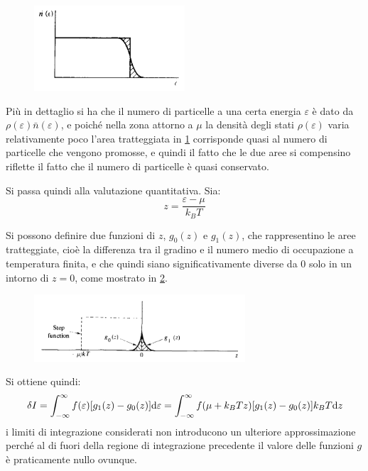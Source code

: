 \begin{figure}[b]
	\centering
	\includegraphics[width=0.5\textwidth]{Immagini/SmoothStep.png}
	\caption{}
	\label{fig:stepsmooth}
\end{figure}

Più in dettaglio si ha che il numero di particelle a una certa energia $\varepsilon$ è dato da $\rho(\varepsilon)\bar{n}(\varepsilon)$, e poiché nella zona attorno a $\mu$ la densità degli stati $\rho(\varepsilon)$ varia relativamente poco l'area tratteggiata in \cref{fig:stepsmooth} corrisponde quasi al numero di particelle che vengono promosse, e quindi il fatto che le due aree si compensino riflette il fatto che il numero di particelle è quasi conservato.
\newline

Si passa quindi alla valutazione quantitativa. Sia:
\begin{equation*}
	z = \frac{\varepsilon - \mu}{k_B T}
\end{equation*}

Si possono definire due funzioni di $z$, $g_0(z)$ e $g_1(z)$, che rappresentino le aree tratteggiate, cioè la differenza tra il gradino e il numero medio di occupazione a temperatura finita, e che quindi siano significativamente diverse da $0$ solo in un intorno di $z=0$, come mostrato in \cref{fig:stepdiffunc}.

\begin{figure}[t]
	\centering
	\includegraphics[width=0.7\textwidth]{Immagini/SmoothStepDifferences.png}
	\caption{}
	\label{fig:stepdiffunc}
\end{figure}

Si ottiene quindi:
\begin{equation*}
\delta I = \int_{-\infty}^{\infty} f(\varepsilon)[g_1(z) - g_0(z)] \dd \varepsilon = \int_{-\infty}^{\infty} f(\mu + k_B T z)[g_1(z) - g_0(z)] k_B T \dd z
\end{equation*}
i limiti di integrazione considerati non introducono un ulteriore approssimazione perché al di fuori della regione di integrazione precedente il valore delle funzioni $g$ è praticamente nullo ovunque.

